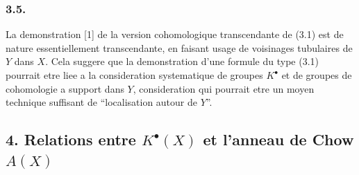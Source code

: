 \subsubsection*{3.5.}
La demonstration [1] de la version cohomologique transcendante de (3.1) est de nature essentiellement transcendante, en faisant usage de voisinages tubulaires de $Y$ dans $X$. Cela suggere que la demonstration d'une formule du type (3.1) pourrait etre liee a la consideration systematique de groupes $K^{\bullet}$ et de groupes de cohomologie a support dans $Y$, consideration qui pourrait etre un moyen technique suffisant de ``localisation autour de $Y$''.


\subsection*{4. Relations entre $K^{\bullet}(X)$ et l'anneau de Chow $A(X)$}

